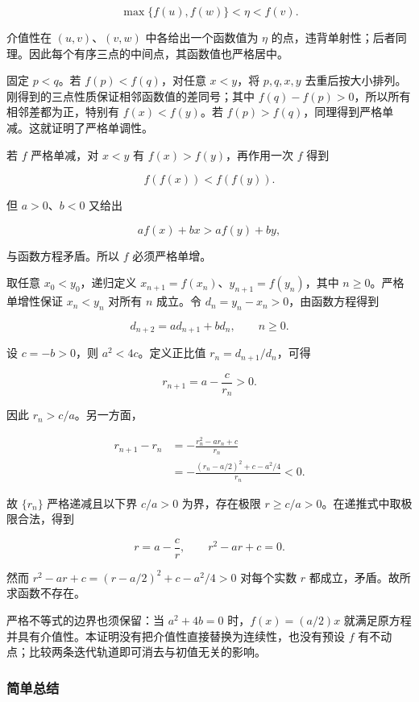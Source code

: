 \documentclass[11pt,a4paper]{article}
\begin{document}
\[
\max\{f(u),f(w)\}<\eta<f(v).
\]

介值性在 \((u,v)\)、\((v,w)\) 中各给出一个函数值为 \(\eta\)
的点，违背单射性；后者同理。因此每个有序三点的中间点，其函数值也严格居中。

固定 \(p<q\)。若 \(f(p)<f(q)\)，对任意 \(x<y\)，将 \(p,q,x,y\)
去重后按大小排列。刚得到的三点性质保证相邻函数值的差同号；其中
\(f(q)-f(p)>0\)，所以所有相邻差都为正，特别有 \(f(x)<f(y)\)。若
\(f(p)>f(q)\)，同理得到严格单减。这就证明了严格单调性。

若 \(f\) 严格单减，对 \(x<y\) 有 \(f(x)>f(y)\)，再作用一次 \(f\) 得到

\[
f(f(x))<f(f(y)).
\]

但 \(a>0\)、\(b<0\) 又给出

\[
af(x)+bx>af(y)+by,
\]

与函数方程矛盾。所以 \(f\) 必须严格单增。

取任意 \(x_0<y_0\)，递归定义
\(x_{n+1}=f(x_n)\)、\(y_{n+1}=f(y_n)\)，其中 \(n\ge0\)。严格单增性保证
\(x_n<y_n\) 对所有 \(n\) 成立。令 \(d_n=y_n-x_n>0\)，由函数方程得到

\[
d_{n+2}=a d_{n+1}+b d_n,\qquad n\ge0.
\]

设 \(c=-b>0\)，则 \(a^2<4c\)。定义正比值 \(r_n=d_{n+1}/d_n\)，可得

\[
r_{n+1}=a-\frac{c}{r_n}>0.
\]

因此 \(r_n>c/a\)。另一方面，

\[
\begin{aligned}
r_{n+1}-r_n
&=-\frac{r_n^2-a r_n+c}{r_n}\\
&=-\frac{(r_n-a/2)^2+c-a^2/4}{r_n}<0.
\end{aligned}
\]

故 \(\{r_n\}\) 严格递减且以下界 \(c/a>0\) 为界，存在极限
\(r\ge c/a>0\)。在递推式中取极限合法，得到

\[
r=a-\frac cr,\qquad r^2-ar+c=0.
\]

然而 \(r^2-ar+c=(r-a/2)^2+c-a^2/4>0\) 对每个实数 \(r\)
都成立，矛盾。故所求函数不存在。

严格不等式的边界也须保留：当 \(a^2+4b=0\) 时，\(f(x)=(a/2)x\)
就满足原方程并具有介值性。本证明没有把介值性直接替换为连续性，也没有预设
\(f\) 有不动点；比较两条迭代轨道即可消去与初值无关的影响。

\subsubsection{简单总结}\label{ux7b80ux5355ux603bux7ed3-12}
\end{document}
